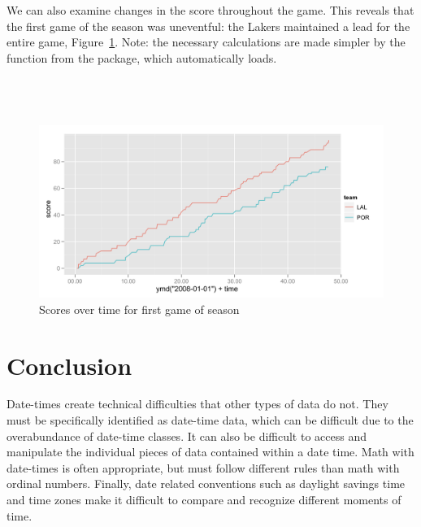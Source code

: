 \documentclass[article]{jss}
\begin{document}
We can also examine changes in the score throughout the game. This reveals that the first game of the season was uneventful: the Lakers maintained a lead for the entire game, Figure~\ref{fig:scores}. Note: the necessary calculations are made simpler by the  function from the  package, which  automatically loads. \\

\\
\\
\\

\begin{figure}[htpb]
  \centering
  \includegraphics[width=\textwidth]{score-comparison.png}        
  \caption{Scores over time for first game of season}
  \label{fig:scores}
\end{figure}


\section{Conclusion}
Date-times create technical difficulties that other types of data do not. They must be specifically identified as date-time data, which can be difficult due to the overabundance of date-time classes. It can also be difficult to access and manipulate the individual pieces of data contained within a date time. Math with date-times is often appropriate, but must follow different rules than math with ordinal numbers. Finally, date related conventions such as daylight savings time and time zones make it difficult to compare and recognize different moments of time.
\end{document}
